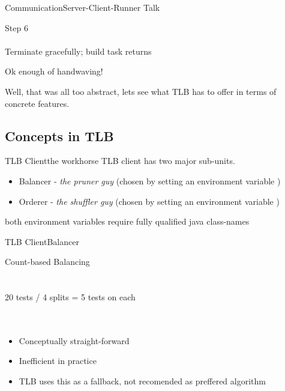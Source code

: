\documentclass{beamer}
\begin{document}
\begin{frame}{Communication}{Server-Client-Runner Talk}
  \begin{multicols}{2}
    \begin{centering}
    \end{centering}
    \begin{center}
      {\huge Step 6}\\
      \quad\\
          {\large Terminate gracefully; build task returns}
    \end{center}
  \end{multicols}
\end{frame}

\begin{frame}{Ok enough of handwaving!}
  \begin{center}
    Well, that was all too abstract, lets see what TLB has to offer in terms of concrete features.
  \end{center}
\end{frame}

\subsection{Concepts in TLB}

\begin{frame}{TLB Client}{the workhorse}
  TLB client has two major sub-units.
  \pause
  \quad\\
  \begin{itemize}
  \item Balancer - \emph{the pruner guy} ({\small chosen by setting an environment variable })
    \quad\\
    \pause
  \item Orderer - \emph{the shuffler guy} ({\small chosen by setting an environment variable })
  \end{itemize}
  {\tiny both environment variables require fully qualified java class-names}
\end{frame}

\begin{frame}{TLB Client}{Balancer}
  \begin{center}
    {\large Count-based Balancing}\\
    \quad\\
    \quad\\
    20 tests / 4 splits = 5 tests on each\\
    \quad\\
    \quad\\
    \begin{itemize}
    \item Conceptually straight-forward
    \item Inefficient in practice
    \item TLB uses this as a fallback, not recomended as preffered algorithm
    \end{itemize}
  \end{center}
\end{frame}
\end{document}
